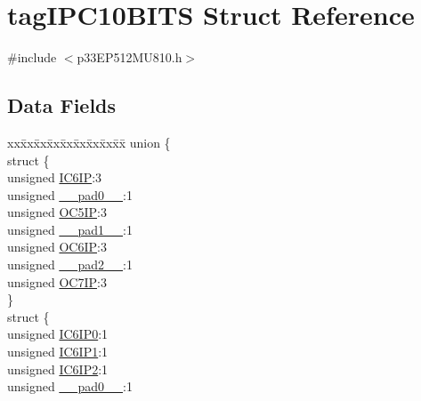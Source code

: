 \hypertarget{structtag_i_p_c10_b_i_t_s}{}\section{tag\+I\+P\+C10\+B\+I\+TS Struct Reference}
\label{structtag_i_p_c10_b_i_t_s}


{\ttfamily \#include $<$p33\+E\+P512\+M\+U810.\+h$>$}

\subsection*{Data Fields}
\begin{DoxyCompactItemize}
\item 
\begin{tabbing}
xx\=xx\=xx\=xx\=xx\=xx\=xx\=xx\=xx\=\kill
union \{\\
\>struct \{\\
\>\>unsigned \hyperlink{structtag_i_p_c10_b_i_t_s_a2411d278d69488131156769a58a40977}{IC6IP}:3\\
\>\>unsigned \hyperlink{structtag_i_p_c10_b_i_t_s_adf71f3d8410c1f1dbbc96680a92c49af}{\_\_pad0\_\_}:1\\
\>\>unsigned \hyperlink{structtag_i_p_c10_b_i_t_s_ac0d5590d5b868f748e7065e84abc4a33}{OC5IP}:3\\
\>\>unsigned \hyperlink{structtag_i_p_c10_b_i_t_s_acaf2d0924a107ec6e8d2e31febaf66f9}{\_\_pad1\_\_}:1\\
\>\>unsigned \hyperlink{structtag_i_p_c10_b_i_t_s_acf6e094f53ab619fff1fd8c716337630}{OC6IP}:3\\
\>\>unsigned \hyperlink{structtag_i_p_c10_b_i_t_s_a4d97cc5f7d51d22fc2bf3eab35c9cb7f}{\_\_pad2\_\_}:1\\
\>\>unsigned \hyperlink{structtag_i_p_c10_b_i_t_s_ad71ec7c957f23483526c6f9625914230}{OC7IP}:3\\
\>\} \\
\>struct \{\\
\>\>unsigned \hyperlink{structtag_i_p_c10_b_i_t_s_ab2d699192100a57584a8f540095a3467}{IC6IP0}:1\\
\>\>unsigned \hyperlink{structtag_i_p_c10_b_i_t_s_a07bf6890e71dd31283c1271b01da137e}{IC6IP1}:1\\
\>\>unsigned \hyperlink{structtag_i_p_c10_b_i_t_s_a5a1100cb241ce92209123d3b8147fb9e}{IC6IP2}:1\\
\>\>unsigned \hyperlink{structtag_i_p_c10_b_i_t_s_adf71f3d8410c1f1dbbc96680a92c49af}{\_\_pad0\_\_}:1\\

\end{tabbing}
\end{DoxyCompactItemize}
